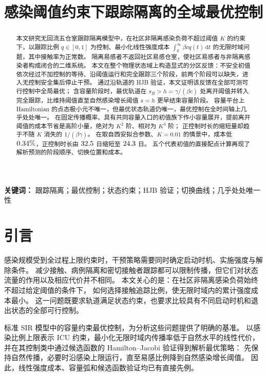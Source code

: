 \documentclass[11pt,a4paper,UTF8]{ctexart}
\title{\bfseries 感染阈值约束下跟踪隔离的全域最优控制}
\author{}
\date{}
\theoremstyle{definition}
\newcommand{\dd}{\,\mathrm d}
\begin{document}
\maketitle

\begin{abstract}
本文研究无回流五仓室跟踪隔离模型中，在社区非隔离感染负荷不超过阈值 $K$ 的约束下，以跟踪比例 $q\in[0,1]$ 为控制、最小化线性强度成本 $\int_0^\infty\beta cq(t)\dd t$ 的无限时域问题，其中接触率为正常数。
隔离易感者不返回社区易感仓室，使社区易感者与非隔离感染者构成闭合的二维系统。
本文在整个物理状态域上构造显式的分区反馈：不安全初值依次经过不加控制的等待、沿阈值运行和完全跟踪三个阶段，前两个阶段可以缺失，进入无控制安全集后停止干预。
通过沿轨道的 HJB 验证，本文证明该反馈在全部可测可行控制中全局最优；
含容量阶段时，最优轨道在 $s_B>h=\gamma/(\beta c)$ 处离开阈值并转入完全跟踪，比维持阈值直至自然感染增长阈值 $s=h$ 更早结束容量阶段。
容量平台上 Hamiltonian 的点态极小元不唯一，但最优状态轨道仍唯一，最优控制在全时间轴上几乎处处唯一。
在固定传播概率、具有共同容量入口的初值族下作小容量展开，提前离开阈值的成本节省是高阶小量，绝对为 $K^2$ 阶、相对为 $K^3$ 阶；
正控制时长的缩短量却趋于不随 $K$ 消失的 $1/(\beta\gamma)$。
在取自西安拟合参数、$K=0.01$ 的情景中，成本低 $0.34\%$，正控制时长由 $32.5$ 日缩短至 $24.3$ 日。
五个代表初值的直接配点计算再现了解析预测的阶段顺序、切换位置和成本。
\end{abstract}
\noindent\textbf{关键词：} 跟踪隔离；最优控制；状态约束；HJB 验证；切换曲线；几乎处处唯一性

\section{引言}
\label{sec:introduction}

感染规模受到全过程上限约束时，干预策略需要同时确定启动时机、实施强度与解除条件。
减少接触、病例隔离和密切接触者跟踪都可以限制传播，但它们对状态流量的作用以及相应代价并不相同\citep{Kretzschmar2020,Zhou2024SPCI}。
本文关心的是：在社区非隔离感染负荷始终不超过给定阈值的条件下，
如何选择接触追踪比例，使无限时域内的累计强度成本最小。
这一问题既要求轨道满足状态约束，也要求比较具有不同启动时机和退出状态的全部可行控制。

标准 SIR 模型中的容量约束最优控制，为分析这些问题提供了明确的基准。
\citet{MicloSpiroWeibull2022}以感染比例上限表示 ICU 约束，最小化无限时域内传播率低于自然水平的线性代价，
并在其控制类中通过候选函数的 Hamilton--Jacobi 验证得到解析最优策略：
先保持自然传播，必要时沿感染上限运行，直至易感比例降到自然感染增长阈值。
因此，线性强度成本、容量弧和候选函数验证均已有直接先例。
\end{document}

